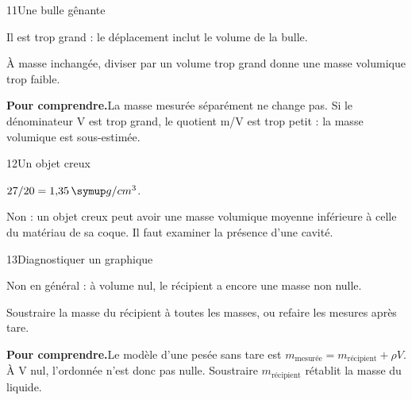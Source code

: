 \par\noindent\begin{minipage}{\linewidth}
\begin{corrige}{11}{Une bulle gênante}
\begin{questions}
\item Il est trop grand : le déplacement inclut le volume de la bulle.
\item À masse inchangée, diviser par un volume trop grand donne une masse volumique trop faible.
\end{questions}
\par\smallskip\noindent\textbf{Pour comprendre.}\enspace La masse mesurée séparément ne change pas. Si le dénominateur V est trop grand, le quotient m/V est trop petit : la masse volumique est sous-estimée.\par
{}
\end{corrige}
\end{minipage}
\par\noindent\begin{minipage}{\linewidth}
\begin{corrige}{12}{Un objet creux}
\begin{questions}
\item $27/20=1{,}35\unite{g/cm^3}$.
\item Non : un objet creux peut avoir une masse volumique moyenne inférieure à celle du matériau de sa coque. Il faut examiner la présence d’une cavité.
\end{questions}
\end{corrige}
\end{minipage}
\par\noindent\begin{minipage}{\linewidth}
\begin{corrige}{13}{Diagnostiquer un graphique}
\begin{questions}
\item Non en général : à volume nul, le récipient a encore une masse non nulle.
\item Soustraire la masse du récipient à toutes les masses, ou refaire les mesures après tare.
\end{questions}
\par\smallskip\noindent\textbf{Pour comprendre.}\enspace Le modèle d’une pesée sans tare est $m_{\text{mesurée}}=m_{\text{récipient}}+\rho V$. À V nul, l’ordonnée n’est donc pas nulle. Soustraire $m_{\text{récipient}}$ rétablit la masse du liquide.\par
{}
\end{corrige}
\end{minipage}
